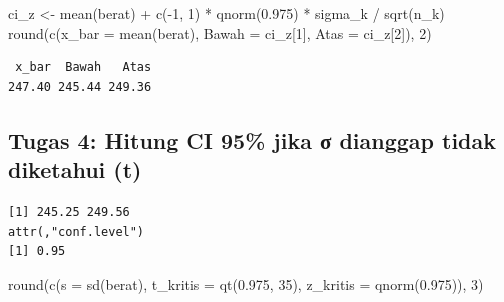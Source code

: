 \documentclass[
  indonesian,
  letterpaper,
]{book}
\newenvironment{Shaded}{\begin{snugshade}}{\end{snugshade}}
\newcommand{\AttributeTok}[1]{\textcolor[rgb]{0.40,0.45,0.13}{#1}}
\newcommand{\DecValTok}[1]{\textcolor[rgb]{0.68,0.00,0.00}{#1}}
\newcommand{\FloatTok}[1]{\textcolor[rgb]{0.68,0.00,0.00}{#1}}
\newcommand{\FunctionTok}[1]{\textcolor[rgb]{0.28,0.35,0.67}{#1}}
\newcommand{\NormalTok}[1]{\textcolor[rgb]{0.00,0.23,0.31}{#1}}
\newcommand{\OtherTok}[1]{\textcolor[rgb]{0.00,0.23,0.31}{#1}}
\newcommand{\SpecialCharTok}[1]{\textcolor[rgb]{0.37,0.37,0.37}{#1}}
\begin{document}
\begin{Shaded}
\begin{Highlighting}[]
\NormalTok{ci\_z }\OtherTok{\textless{}{-}} \FunctionTok{mean}\NormalTok{(berat) }\SpecialCharTok{+} \FunctionTok{c}\NormalTok{(}\SpecialCharTok{{-}}\DecValTok{1}\NormalTok{, }\DecValTok{1}\NormalTok{) }\SpecialCharTok{*} \FunctionTok{qnorm}\NormalTok{(}\FloatTok{0.975}\NormalTok{) }\SpecialCharTok{*}\NormalTok{ sigma\_k }\SpecialCharTok{/} \FunctionTok{sqrt}\NormalTok{(n\_k)}
\FunctionTok{round}\NormalTok{(}\FunctionTok{c}\NormalTok{(}\AttributeTok{x\_bar =} \FunctionTok{mean}\NormalTok{(berat), }\AttributeTok{Bawah =}\NormalTok{ ci\_z[}\DecValTok{1}\NormalTok{], }\AttributeTok{Atas =}\NormalTok{ ci\_z[}\DecValTok{2}\NormalTok{]), }\DecValTok{2}\NormalTok{)}
\end{Highlighting}
\end{Shaded}

\begin{verbatim}
 x_bar  Bawah   Atas 
247.40 245.44 249.36 
\end{verbatim}

\subsection{Tugas 4: Hitung CI 95\% jika σ dianggap tidak diketahui
(t)}\label{tugas-4-hitung-ci-95-jika-ux3c3-dianggap-tidak-diketahui-t}

\begin{Shaded}
\end{Shaded}

\begin{verbatim}
[1] 245.25 249.56
attr(,"conf.level")
[1] 0.95
\end{verbatim}

\begin{Shaded}
\begin{Highlighting}[]
\FunctionTok{round}\NormalTok{(}\FunctionTok{c}\NormalTok{(}\AttributeTok{s =} \FunctionTok{sd}\NormalTok{(berat), }\AttributeTok{t\_kritis =} \FunctionTok{qt}\NormalTok{(}\FloatTok{0.975}\NormalTok{, }\DecValTok{35}\NormalTok{), }\AttributeTok{z\_kritis =} \FunctionTok{qnorm}\NormalTok{(}\FloatTok{0.975}\NormalTok{)), }\DecValTok{3}\NormalTok{)}
\end{Highlighting}
\end{Shaded}
\end{document}
